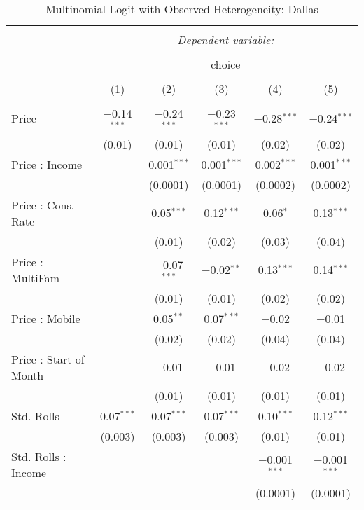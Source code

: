 
\begin{table}[!htbp] \centering 
  \caption{Multinomial Logit with Observed Heterogeneity: Dallas} 
  \label{tab:mnlDallasObsHet} 
\begin{tabular}{@{\extracolsep{5pt}}lccccc} 
\\[-1.8ex]\hline 
\hline \\[-1.8ex] 
 & \multicolumn{5}{c}{\textit{Dependent variable:}} \\ 
\cline{2-6} 
\\[-1.8ex] & \multicolumn{5}{c}{choice} \\ 
\\[-1.8ex] & (1) & (2) & (3) & (4) & (5)\\ 
\hline \\[-1.8ex] 
 Price & $-$0.14$^{***}$ & $-$0.24$^{***}$ & $-$0.23$^{***}$ & $-$0.28$^{***}$ & $-$0.24$^{***}$ \\ 
  & (0.01) & (0.01) & (0.01) & (0.02) & (0.02) \\ 
  Price : Income &  & 0.001$^{***}$ & 0.001$^{***}$ & 0.002$^{***}$ & 0.001$^{***}$ \\ 
  &  & (0.0001) & (0.0001) & (0.0002) & (0.0002) \\ 
  Price : Cons. Rate &  & 0.05$^{***}$ & 0.12$^{***}$ & 0.06$^{*}$ & 0.13$^{***}$ \\ 
  &  & (0.01) & (0.02) & (0.03) & (0.04) \\ 
  Price : MultiFam &  & $-$0.07$^{***}$ & $-$0.02$^{**}$ & 0.13$^{***}$ & 0.14$^{***}$ \\ 
  &  & (0.01) & (0.01) & (0.02) & (0.02) \\ 
  Price : Mobile &  & 0.05$^{**}$ & 0.07$^{***}$ & $-$0.02 & $-$0.01 \\ 
  &  & (0.02) & (0.02) & (0.04) & (0.04) \\ 
  Price : Start of Month &  & $-$0.01 & $-$0.01 & $-$0.02 & $-$0.02 \\ 
  &  & (0.01) & (0.01) & (0.01) & (0.01) \\ 
  Std. Rolls & 0.07$^{***}$ & 0.07$^{***}$ & 0.07$^{***}$ & 0.10$^{***}$ & 0.12$^{***}$ \\ 
  & (0.003) & (0.003) & (0.003) & (0.01) & (0.01) \\ 
  Std. Rolls : Income &  &  &  & $-$0.001$^{***}$ & $-$0.001$^{***}$ \\ 
  &  &  &  & (0.0001) & (0.0001) \\ 

\end{tabular}
\end{table}
